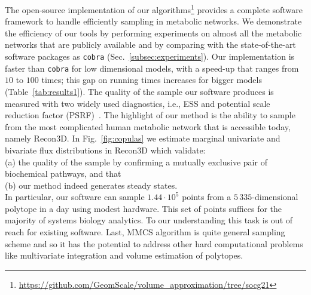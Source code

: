    The open-source implementation of our algorithms\footnote{\url{https://github.com/GeomScale/volume_approximation/tree/socg21}} provides a
   complete software framework to handle efficiently sampling in metabolic
   networks. We demonstrate the efficiency of our tools by performing experiments
   on almost all the metabolic networks that are publicly available and by
   comparing with the
   state-of-the-art software packages as \texttt{cobra}
   (Sec.~\ref{subsec:experiments}). Our implementation is faster than \texttt{cobra}
   for low dimensional models,  with a speed-up that ranges from $10$ to $100$ times;
   this gap on running times increases for bigger models
   (Table~\ref{tab:results1}). The quality of the sample our software produces is
   measured with two widely used diagnostics, i.e., ESS and potential scale reduction factor (PSRF)~\cite{Gelman92}. The highlight of
   our method is the ability to sample from the most complicated human metabolic
   network that is accessible today, namely Recon3D. In Fig.~\ref{fig:copulas} we estimate marginal univariate and bivariate flux distributions in Recon3D which validate: \\
   (a) the  quality of the sample by confirming a mutually exclusive pair of biochemical pathways,
   and that \\
   (b) our method indeed generates steady states. \\
   In particular, our software can sample $1.44\cdot 10^5$ points from a $5\,335$-dimensional polytope in a day
   using modest hardware. This set of points suffices for the majority of systems
   biology analytics.
   To our understanding this task is out of reach for existing software.
   Last, MMCS algorithm is quite general sampling scheme and
   so it has the potential to address other
   hard computational problems like  multivariate integration and volume estimation of polytopes.







